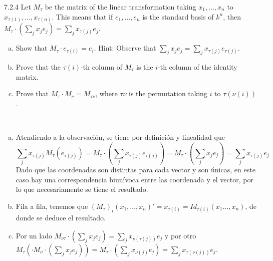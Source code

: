 \documentclass[twoside]{article}
\begin{document}
\begin{ejercicio}{7.2.4}
Let $M_{τ}$ be the matrix of the linear transformation taking $x_1,\dots , x_n$ to $x_{τ(1)},\dots , x_{τ(n)}$.
This means that if $e_1, \dots, e_n$ is the standard basis of $k^n$, then $M_τ \cdot(\sum_j x_je_j) =\sum_j x_{τ(j)}e_j$.
\begin{enumerate}[a.]
\item Show that $M_τ \cdot e_{τ(i)} = e_i$. Hint: Observe that
$\sum_j x_je_j =\sum_j x_{τ(j)}e_{τ(j)}$.
\item Prove that the $τ(i)$-th column of $M_τ$ is the $i$-th column of the identity matrix.
\item Prove that $M_τ \cdot M_ν = M_{τν}$, where $τν$ is the permutation taking $i$ to $τ(ν(i))$.
\end{enumerate}

\end{ejercicio}
\begin{solucion}\
\begin{enumerate}[a.]
\item Atendiendo a la observación, se tiene por definición y linealidad que $$ \sum_j x_{\tau(j)}M_{\tau}(e_{\tau(j)})= M_τ \cdot(\sum_j x_{τ(j)}e_{τ(j)})=M_τ \cdot(
\sum_j x_je_j) =\sum_j x_{τ(j)}e_j$$
Dado que las coordenadas son distintas para cada vector y son únicas, en este caso hay una correspondencia biunívoca entre las coordenada y el vector, por lo que necesariamente se tiene el resultado. 
\item Fila a fila, tenemos que $(M_τ)_i(x_1,\dots, x_n)'=x_{\tau(i)}=Id_{\tau(i)}(x_1\dots, x_n)$, de donde se deduce el resultado.  
\item Por un lado $M_{ντ}\cdot(\sum_j x_je_j) =\sum_j x_{\nu(τ(j))}e_j$ y por otro $M_τ (\cdot M_ν \cdot(\sum_j x_je_j))=M_τ \cdot(\sum_j x_{\nu(j)}e_j)=\sum_j x_{\tau(\nu(j))}e_j$.
\end{enumerate}
\end{solucion}
\newpage
\end{document}
